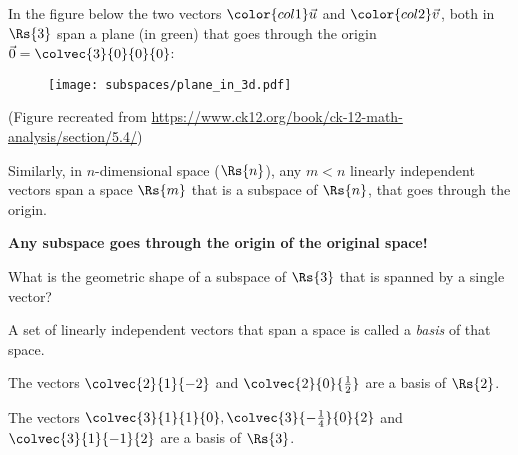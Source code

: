 In the figure below the two vectors $\color{col1}\vec{u}$ and $\color{col2}\vec{v}$, both in $\Rs{3}$ span a plane (in green) that goes through the origin $\vec{0}=\colvec{3}{0}{0}{0}$:
\begin{figure}[H]
  \centering
  \texttt{[image: subspaces/plane\_in\_3d.pdf]}
\end{figure}
(Figure recreated from \url{https://www.ck12.org/book/ck-12-math-analysis/section/5.4/})

Similarly, in $n$-dimensional space ($\Rs{n}$), any $m<n$ linearly independent vectors span a space $\Rs{m}$ that is a subspace of $\Rs{n}$, that goes through the origin.

\begin{warning}
  \textbf{Any subspace goes through the origin of the original space!}
\end{warning}
\begin{challange}
  What is the geometric shape of a subspace of $\Rs{3}$ that is spanned by a single vector?
\end{challange}

A set of linearly independent vectors that span a space is called a \emph{basis} of that space.
\begin{example}
  The vectors $\colvec{2}{1}{-2}$ and $\colvec{2}{0}{\frac{1}{2}}$ are a basis of $\Rs{2}$.
  
  The vectors $\colvec{3}{1}{1}{0}, \colvec{3}{-\frac{1}{4}}{0}{2}$ and $\colvec{3}{1}{-1}{2}$ are a basis of $\Rs{3}$.
\end{example}


